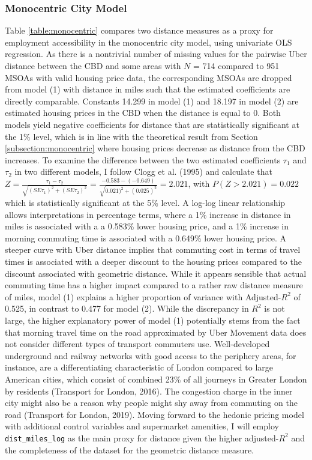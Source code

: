 \documentclass{article}
\begin{document}
\subsubsection{Monocentric City Model}
Table \ref{table:monocentric} compares two distance measures as a proxy for employment accessibility in the monocentric city model, using univariate OLS regression. As there is a nontrivial number of missing values for the pairwise Uber distance between the CBD and some areas with $N$ = 714 compared to 951 MSOAs with valid housing price data, the corresponding MSOAs are dropped from model (1) with distance in miles such that the estimated coefficients are directly comparable. Constants 14.299 in model (1) and 18.197 in model (2) are estimated housing prices in the CBD when the distance is equal to 0. Both models yield negative coefficients for distance that are statistically significant at the 1\% level, which is in line with the theoretical result from Section \ref{subsection:monocentric} where housing prices decrease as distance from the CBD increases. To examine the difference between the two estimated coefficients $\tau_1$ and $\tau_2$ in two different models, I follow Clogg et al. (1995) and calculate that $Z = \frac{\tau_1 - \tau_2}{\sqrt{(SE\tau_1)^2 + (SE\tau_2)^2}}  = \frac{-0.583 - (-0.649)}{\sqrt{0.021)^2 + (0.025)^2}} = 2.021$, with $P(Z > 2.021) = 0.022$  which is statistically significant at the 5\% level. A log-log linear relationship allows interpretations in percentage terms, where a 1\% increase in distance in miles is associated with a a 0.583\% lower housing price, and a 1\% increase in morning commuting time is associated with a 0.649\% lower housing price.  A steeper curve with Uber distance implies that commuting cost in terms of travel times is associated with a deeper discount to the housing prices compared to the discount associated with geometric distance. While it appears sensible that actual commuting time has a higher impact compared to a rather raw distance measure of miles, model (1) explains a higher proportion of variance with Adjusted-$R^2$ of 0.525, in contrast to 0.477 for model (2). While the discrepancy in $R^2$ is not large, the higher explanatory power of model (1) potentially stems from the fact that morning travel time on the road approximated by Uber Movement data does not consider different types of transport commuters use. Well-developed underground and railway networks with good access to the periphery areas, for instance, are a differentiating characteristic of London compared to large American cities, which consist of combined 23\% of all journeys in Greater London by residents (Transport for London, 2016). The congestion charge in the inner city might also be a reason why people might shy away from commuting on the road (Transport for London, 2019). Moving forward to the hedonic pricing model with additional control variables and supermarket amenities, I will employ \texttt{dist\_miles\_log} as the main proxy for distance given the higher adjusted-$R^2$ and the completeness of the dataset for the geometric distance measure.
\end{document}
